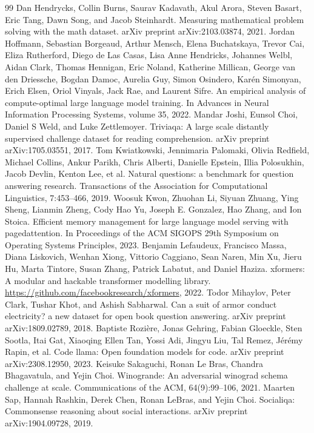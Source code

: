 \documentclass[a4paper,11pt]{article}
\begin{document}
\begin{thebibliography}{99}
 Dan Hendrycks, Collin Burns, Saurav Kadavath, Akul Arora, Steven Basart, Eric Tang, Dawn Song, and Jacob Steinhardt. Measuring mathematical problem solving with the math dataset. arXiv preprint arXiv:2103.03874, 2021.
 Jordan Hoffmann, Sebastian Borgeaud, Arthur Mensch, Elena Buchatskaya, Trevor Cai, Eliza Rutherford, Diego de Las Casas, Lisa Anne Hendricks, Johannes Welbl, Aidan Clark, Thomas Hennigan, Eric Noland, Katherine Millican, George van den Driessche, Bogdan Damoc, Aurelia Guy, Simon Osindero, Karén Simonyan, Erich Elsen, Oriol Vinyals, Jack Rae, and Laurent Sifre. An empirical analysis of compute-optimal large language model training. In Advances in Neural Information Processing Systems, volume 35, 2022.
 Mandar Joshi, Eunsol Choi, Daniel S Weld, and Luke Zettlemoyer. Triviaqa: A large scale distantly supervised challenge dataset for reading comprehension. arXiv preprint arXiv:1705.03551, 2017.
 Tom Kwiatkowski, Jennimaria Palomaki, Olivia Redfield, Michael Collins, Ankur Parikh, Chris Alberti, Danielle Epstein, Illia Polosukhin, Jacob Devlin, Kenton Lee, et al. Natural questions: a benchmark for question answering research. Transactions of the Association for Computational Linguistics, 7:453--466, 2019.
 Woosuk Kwon, Zhuohan Li, Siyuan Zhuang, Ying Sheng, Lianmin Zheng, Cody Hao Yu, Joseph E. Gonzalez, Hao Zhang, and Ion Stoica. Efficient memory management for large language model serving with pagedattention. In Proceedings of the ACM SIGOPS 29th Symposium on Operating Systems Principles, 2023.
 Benjamin Lefaudeux, Francisco Massa, Diana Liskovich, Wenhan Xiong, Vittorio Caggiano, Sean Naren, Min Xu, Jieru Hu, Marta Tintore, Susan Zhang, Patrick Labatut, and Daniel Haziza. xformers: A modular and hackable transformer modelling library. \url{https://github.com/facebookresearch/xformers}, 2022.
 Todor Mihaylov, Peter Clark, Tushar Khot, and Ashish Sabharwal. Can a suit of armor conduct electricity? a new dataset for open book question answering. arXiv preprint arXiv:1809.02789, 2018.
 Baptiste Rozière, Jonas Gehring, Fabian Gloeckle, Sten Sootla, Itai Gat, Xiaoqing Ellen Tan, Yossi Adi, Jingyu Liu, Tal Remez, Jérémy Rapin, et al. Code llama: Open foundation models for code. arXiv preprint arXiv:2308.12950, 2023.
 Keisuke Sakaguchi, Ronan Le Bras, Chandra Bhagavatula, and Yejin Choi. Winogrande: An adversarial winograd schema challenge at scale. Communications of the ACM, 64(9):99--106, 2021.
 Maarten Sap, Hannah Rashkin, Derek Chen, Ronan LeBras, and Yejin Choi. Socialiqa: Commonsense reasoning about social interactions. arXiv preprint arXiv:1904.09728, 2019.

\end{thebibliography}
\end{document}

